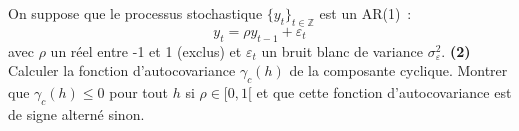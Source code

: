 \documentclass[10pt,a4paper,notitlepage,twocolumn]{article}
\newcommand{\question}[1]{\textbf{(#1)}}
\begin{document}
On suppose que le processus
stochastique $\{y_t\}_{t\in\mathbb Z}$ est un AR(1) :
\[
y_t = \rho y_{t-1} + \varepsilon_t
\]
avec $\rho$ un réel entre -1 et 1 (exclus) et $\varepsilon_t$ un bruit blanc de variance $\sigma_{\varepsilon}^2$.
\question{2} Calculer la fonction d'autocovariance $\gamma_c(h)$ de la
composante cyclique. Montrer que $\gamma_c(h)\leq 0$ pour tout $h$ si
$\rho\in[0,1[$ et que cette fonction d'autocovariance est de signe
alterné sinon.
\end{document}
